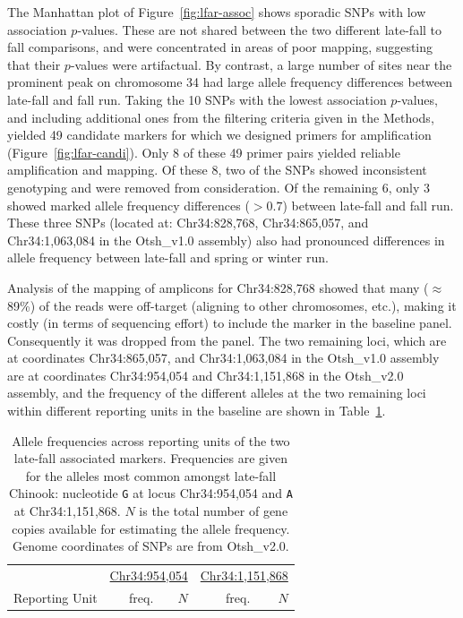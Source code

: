 The Manhattan plot of Figure~\ref{fig:lfar-assoc} shows sporadic SNPs with low association
$p$-values.  These are not shared between the two different late-fall to fall comparisons, and
were concentrated in areas of poor mapping, suggesting that their
$p$-values were artifactual.  By contrast, a large number of sites near the prominent peak on
chromosome 34 had large allele frequency differences between late-fall and fall run.  Taking the
10 SNPs with the lowest association $p$-values, and including additional ones from the filtering criteria given in the
Methods, yielded 49 candidate markers for which we designed primers for amplification (Figure~\ref{fig:lfar-candi}).  Only 8
of these 49 primer pairs yielded reliable amplification and mapping.   Of these 8, two of the SNPs
showed inconsistent genotyping and were removed from consideration.  Of the remaining 6, only 3
showed marked allele frequency differences ($> 0.7$) between late-fall and fall run.  These three
SNPs (located at: Chr34:828,768,  Chr34:865,057, and Chr34:1,063,084 in the Otsh\_v1.0 assembly)
also had pronounced differences in allele frequency between
late-fall and spring or winter run.

Analysis of the mapping of amplicons for Chr34:828,768
showed that many ($\approx$89\%) of the reads were off-target (aligning to other chromosomes,
etc.), making it costly (in terms of sequencing effort) to include the marker in the baseline panel.
Consequently it was dropped from the panel.  The two remaining loci, which are at coordinates
Chr34:865,057, and Chr34:1,063,084 in the Otsh\_v1.0 assembly are at coordinates
Chr34:954,054 and  Chr34:1,151,868 in the Otsh\_v2.0 assembly, and
the frequency of the different alleles at the two remaining loci
within different reporting units in the baseline are shown in Table~\ref{tab:lfar-freqs}.
\begin{table}
\caption{\footnotesize Allele frequencies across reporting units of the two late-fall associated
markers.  Frequencies are given for the alleles most common amongst late-fall Chinook: nucleotide
{\tt G} at locus Chr34:954,054 and {\tt A} at Chr34:1,151,868.  $N$ is the total number of gene
copies available for estimating the allele frequency. Genome coordinates of SNPs are from Otsh\_v2.0.}
\label{tab:lfar-freqs}
{\footnotesize
\begin{tabular*}{0.48\textwidth}{@{\extracolsep{\fill}} lrrrr}
\hline\hline
& \multicolumn{2}{c}{\underline{Chr34:954,054}} & \multicolumn{2}{c}{\underline{Chr34:1,151,868}} \\
Reporting Unit & freq. & $N$ & freq. & $N$ \\ \hline

\end{tabular*}
}
\end{table}

